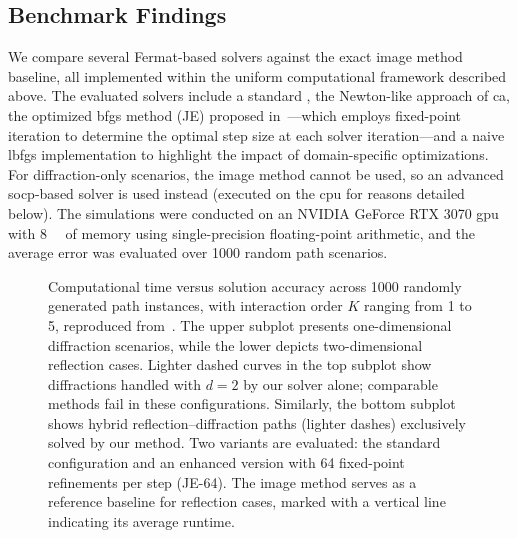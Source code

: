 \subsection{Benchmark Findings}

We compare several Fermat-based solvers against the exact image method baseline, all implemented within the uniform computational framework described above. The evaluated solvers include a standard , the Newton-like approach of \gls{ca}, the optimized \gls{bfgs} method (JE) proposed in~---which employs fixed-point iteration to determine the optimal step size at each solver iteration---and a naive \gls{lbfgs} implementation to highlight the impact of domain-specific optimizations. For diffraction-only scenarios, the image method cannot be used, so an advanced \gls{socp}-based solver is used instead (executed on the \gls{cpu} for reasons detailed below). The simulations were conducted on an NVIDIA GeForce RTX\texttrademark{} 3070 \gls{gpu} with \qty{8}{\giga\byte} of memory using single-precision floating-point arithmetic, and the average error was evaluated over 1000 random path scenarios.

\begin{figure}[t]
  \centering
  \caption{Computational time versus solution accuracy across 1000 randomly generated path instances, with interaction order $K$ ranging from 1 to 5, reproduced from~\cite[Fig.~2]{Eertmans2026EuCAP}. The upper subplot presents one-dimensional diffraction scenarios, while the lower depicts two-dimensional reflection cases. Lighter dashed curves in the top subplot show diffractions handled with $d=2$ by our solver alone; comparable methods fail in these configurations. Similarly, the bottom subplot shows hybrid reflection--diffraction paths (lighter dashes) exclusively solved by our method. Two variants are evaluated: the standard configuration and an enhanced version with 64 fixed-point refinements per step (JE-64). The image method serves as a reference baseline for reflection cases, marked with a vertical line indicating its average runtime.}
\end{figure}

